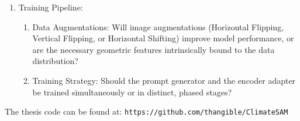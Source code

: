 \begin{enumerate}
\item \begin{minipage}[t]{\linewidth}
Training Pipeline:
\begin{enumerate}
\item \begin{minipage}[t]{\linewidth}
Data Augmentations: Will image augmentations (Horizontal Flipping, Vertical Flipping, or Horizontal Shifting) improve model performance, or are the necessary geometric features intrinsically bound to the data distribution?
\end{minipage}
\item \begin{minipage}[t]{\linewidth}
Training Strategy: Should the prompt generator and the encoder adapter be trained simultaneously or in distinct, phased stages?
\end{minipage}
\end{enumerate}
\end{minipage}
\end{enumerate}



\noindent The thesis code can be found at: \texttt{https://github.com/thangible/ClimateSAM}
